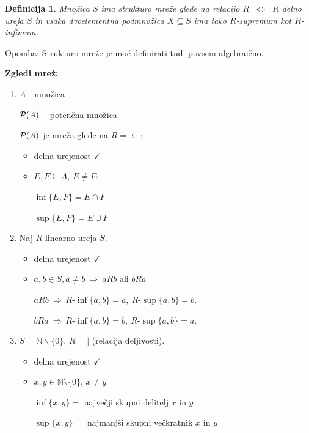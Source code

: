 \documentclass[11pt,paper=b5,footinclude,headinclude]{scrbook} %
\def\sledi {{~\Rightarrow~}}
\def\cee {{~\Leftrightarrow~}}
\newtheorem*{definicija}{Definicija}
\begin{document}
\begin{definicija}
Množica $S$ ima strukturo {\em mreže} glede na relacijo $R$ $\cee$
$R$ delno ureja $S$ in vsaka {\em dvoelementna} podmnožica $X\subseteq S$
ima tako $R$-supremum kot $R$-infimum.
\end{definicija}

\bigskip

Opomba: Strukturo mreže je moč definirati tudi povsem algebraično.

\bigskip

\textbf{ Zgledi mrež:}
\begin{enumerate}
  \item $A$ - množica

  ${\cal P}(A)$ -- potenčna množica

  ${\cal P}(A)$ je mreža glede na $R = \subseteq$:
  \begin{itemize}
    \item delna urejenost $\checkmark$
     \item $E,F\subseteq A$, $E\neq F$:

     $\inf\{E,F\} = E\cap F$

     $\sup\{E,F\} = E\cup F$
  \end{itemize}
  \item Naj $R$ linearno ureja $S$.
\begin{itemize}
    \item delna urejenost $\checkmark$

    \item
   $a, b\in S, a\neq b\sledi aRb$ ali $bRa$

$aRb\sledi R\textrm{-}\inf\{a,b\} = a,~R\textrm{-}\sup\{a,b\} = b$.

$bRa\sledi R\textrm{-}\inf\{a,b\} = b,~R\textrm{-}\sup\{a,b\} = a$.
\end{itemize}

  \item $S = \mathbb{N}\backslash \{0\}$, $R = |$ (relacija deljivosti).
  \begin{itemize}
    \item delna urejenost $\checkmark$
    \item $x,y\in \mathbb{N}\setminus\{0\}$, $x\neq y$

    $\inf\{x,y\} = $ največji skupni delitelj $x$ in $y$

    $\sup\{x,y\} = $ najmanjši skupni večkratnik $x$ in $y$
  \end{itemize}
\end{enumerate}
\end{document}
